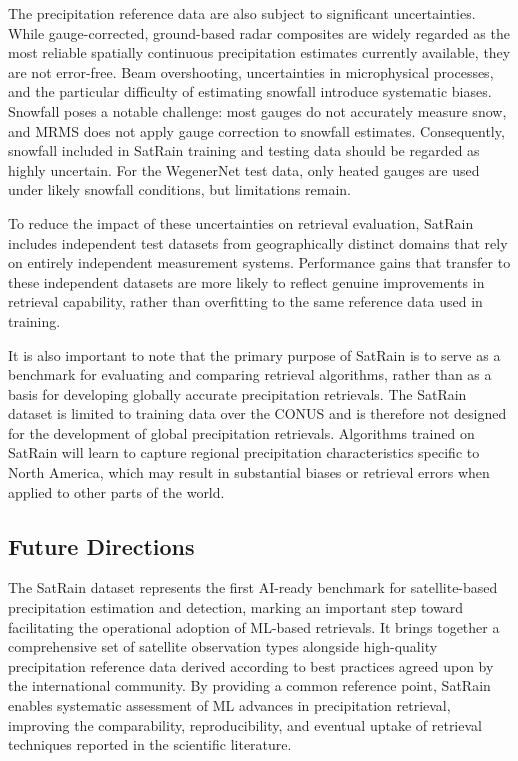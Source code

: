 \documentclass[11pt]{article}
\begin{document}
The precipitation reference data are also subject to significant uncertainties.
While gauge-corrected, ground-based radar composites are widely regarded as the
most reliable spatially continuous precipitation estimates currently available,
they are not error-free. Beam overshooting, uncertainties in microphysical
processes, and the particular difficulty of estimating snowfall introduce
systematic biases. Snowfall poses a notable challenge: most gauges do not
accurately measure snow, and MRMS does not apply gauge correction to snowfall
estimates. Consequently, snowfall included in SatRain training and testing data
should be regarded as highly uncertain. For the WegenerNet test data, only
heated gauges are used under likely snowfall conditions, but limitations remain.

To reduce the impact of these uncertainties on retrieval evaluation, SatRain
includes independent test datasets from geographically distinct domains that
rely on entirely independent measurement systems. Performance gains that
transfer to these independent datasets are more likely to reflect genuine
improvements in retrieval capability, rather than overfitting to the same
reference data used in training.

It is also important to note that the primary purpose of SatRain is to serve as
a benchmark for evaluating and comparing retrieval algorithms, rather than as a
basis for developing globally accurate precipitation retrievals. The SatRain
dataset is limited to training data over the CONUS and is therefore not designed
for the development of global precipitation retrievals. Algorithms trained on
SatRain will learn to capture regional precipitation characteristics specific to
North America, which may result in substantial biases or retrieval errors when
applied to other parts of the world.

\subsection{Future Directions}

The SatRain dataset represents the first AI-ready benchmark for satellite-based
precipitation estimation and detection, marking an important step toward
facilitating the operational adoption of ML-based retrievals. It
brings together a comprehensive set of satellite observation types alongside
high-quality precipitation reference data derived according to best practices
agreed upon by the international community. By providing a common reference
point, SatRain enables systematic assessment of ML advances in
precipitation retrieval, improving the comparability, reproducibility, and
eventual uptake of retrieval techniques reported in the scientific literature.
\end{document}
